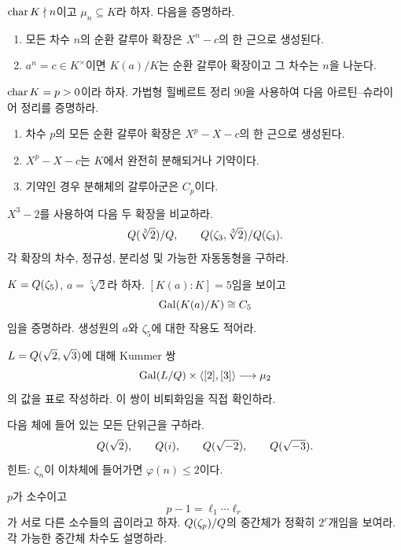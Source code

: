 \begin{exercise}[*]
$\operatorname{char} K\nmid n$이고 $\mu_n\subseteq K$라 하자. 다음을 증명하라.
\begin{enumerate}[label=(\alph*)]
  \item 모든 차수 $n$의 순환 갈루아 확장은 $X^n-c$의 한 근으로 생성된다.
  \item $a^n=c\in K^\times$이면 $K(a)/K$는 순환 갈루아 확장이고 그 차수는 $n$을 나눈다.
\end{enumerate}
\end{exercise}

\begin{exercise}[*]
$\operatorname{char} K=p>0$이라 하자. 가법형 힐베르트 정리 90을 사용하여 다음 아르틴--슈라이어 정리를 증명하라.
\begin{enumerate}[label=(\alph*)]
  \item 차수 $p$의 모든 순환 갈루아 확장은 $X^p-X-c$의 한 근으로 생성된다.
  \item $X^p-X-c$는 $K$에서 완전히 분해되거나 기약이다.
  \item 기약인 경우 분해체의 갈루아군은 $C_p$이다.
\end{enumerate}
\end{exercise}

\begin{exercise}
$X^3-2$를 사용하여 다음 두 확장을 비교하라.
\[
  Q(\sqrt[3]{2})/Q,
  \qquad
  Q(\zeta_3,\sqrt[3]{2})/Q(\zeta_3).
\]
각 확장의 차수, 정규성, 분리성 및 가능한 자동동형을 구하라.
\end{exercise}

\begin{exercise}[*]
$K=Q(\zeta_5)$, $a=\sqrt[5]{2}$라 하자. $[K(a):K]=5$임을 보이고
\[
  \operatorname{Gal}(K(a)/K)\cong C_5
\]
임을 증명하라. 생성원의 $a$와 $\zeta_5$에 대한 작용도 적어라.
\end{exercise}

\begin{exercise}
$L=Q(\sqrt2,\sqrt3)$에 대해 Kummer 쌍
\[
  \operatorname{Gal}(L/Q)\times
  \langle[2],[3]\rangle
  \longrightarrow\mu_2
\]
의 값을 표로 작성하라. 이 쌍이 비퇴화임을 직접 확인하라.
\end{exercise}

\begin{exercise}
다음 체에 들어 있는 모든 단위근을 구하라.
\[
  Q(\sqrt2),\qquad
  Q(i),\qquad
  Q(\sqrt{-2}),\qquad
  Q(\sqrt{-3}).
\]
힌트: $\zeta_n$이 이차체에 들어가면 $\varphi(n)\le2$이다.
\end{exercise}

\begin{exercise}
$p$가 소수이고
\[
  p-1=\ell_1\cdots\ell_r
\]
가 서로 다른 소수들의 곱이라고 하자. $Q(\zeta_p)/Q$의 중간체가 정확히 $2^r$개임을 보여라. 각 가능한 중간체 차수도 설명하라.
\end{exercise}

